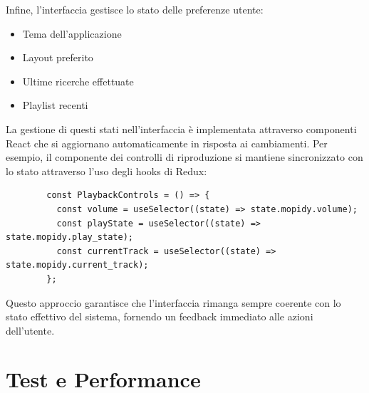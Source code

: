 Infine, l'interfaccia gestisce lo stato delle preferenze utente:

\begin{itemize}
    \item Tema dell'applicazione
    \item Layout preferito
    \item Ultime ricerche effettuate
    \item Playlist recenti
\end{itemize}

La gestione di questi stati nell'interfaccia è implementata attraverso componenti React che si aggiornano automaticamente in risposta ai cambiamenti. Per esempio, il componente dei controlli di riproduzione si mantiene sincronizzato con lo stato attraverso l'uso degli hooks di Redux:

\begin{table}[h]
    \begin{minipage}{\textwidth}
      \begin{verbatim}
        const PlaybackControls = () => {
          const volume = useSelector((state) => state.mopidy.volume);
          const playState = useSelector((state) => state.mopidy.play_state);
          const currentTrack = useSelector((state) => state.mopidy.current_track);
        };
      \end{verbatim}
    \end{minipage}
    \caption{}
    \label{tab:playbackcontrols}
  \end{table}

Questo approccio garantisce che l'interfaccia rimanga sempre coerente con lo stato effettivo del sistema, fornendo un feedback immediato alle azioni dell'utente.

\section{Test e Performance}
\noindent

